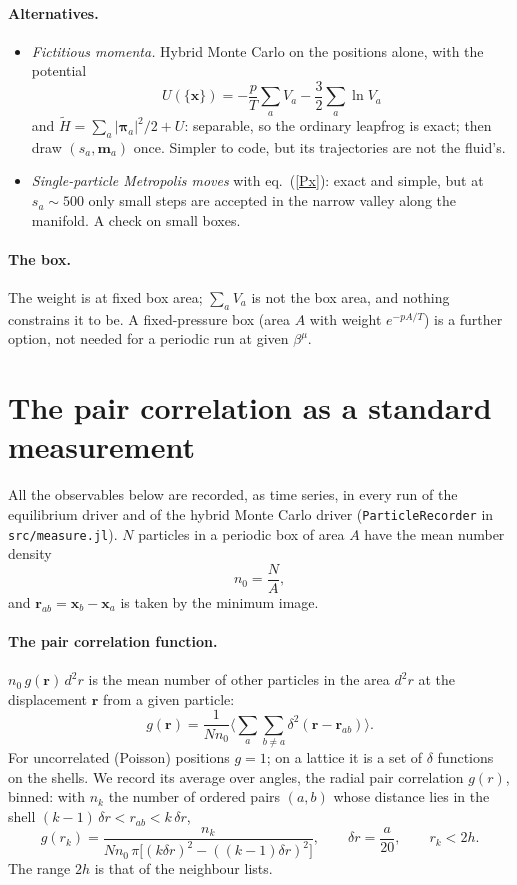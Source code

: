 \documentclass[11pt,aps,preprint,nofootinbib,superscriptaddress,tightenlines]{revtex4-2}
\def\st{\begin{equation}}
\def\stp{\end{equation}}
\def\Eq#1{eq.~(\ref{#1})}
\let\oldparagraph\paragraph
\renewcommand{\paragraph}{\par\bigskip\oldparagraph}
\begin{document}
\paragraph{Alternatives.}
\begin{itemize}
\item \emph{Fictitious momenta.}  Hybrid Monte Carlo on the positions alone, with the potential
  \st
  U(\{\bm x\})=-\frac pT\sum_aV_a-\frac32\sum_a\ln V_a
  \stp
  and $\tilde H=\sum_a|\bm\pi_a|^2/2+U$: separable, so the ordinary leapfrog is exact; then draw $(s_a,\bm m_a)$ once.  Simpler to code,
  but its trajectories are not the fluid's.
\item \emph{Single-particle Metropolis moves} with \Eq{Px}: exact and simple, but at $s_a\sim500$ only small steps are accepted in the
  narrow valley along the manifold.  A check on small boxes.
\end{itemize}

\paragraph{The box.}  The weight is at fixed box area; $\sum_aV_a$ is not the box area, and nothing constrains it to be.
A fixed-pressure box (area $A$ with weight $e^{-pA/T}$) is a further option, not needed for a periodic run at given
$\beta^\mu$.

\section{The pair correlation as a standard measurement}
\label{sec:measurements}

All the observables below are recorded, as time series, in every run of the equilibrium driver and of the hybrid Monte
Carlo driver (\texttt{ParticleRecorder} in \texttt{src/measure.jl}).  $N$ particles in a periodic box of area $A$ have the mean
number density
\st
n_0=\frac NA ,
\stp
and $\bm r_{ab}=\bm x_b-\bm x_a$ is taken by the minimum image.

\paragraph{The pair correlation function.}  $n_0\,g(\bm r)\,d^2r$ is the mean number of other particles in the area $d^2r$ at the
displacement $\bm r$ from a given particle:
\st
g(\bm r)=\frac1{Nn_0}\Big\langle\sum_a\sum_{b\neq a}\delta^2(\bm r-\bm r_{ab})\Big\rangle .
\stp
For uncorrelated (Poisson) positions $g=1$; on a lattice it is a set of $\delta$ functions on the shells.  We record its
average over angles, the radial pair correlation $g(r)$, binned: with $n_k$ the number of ordered pairs $(a,b)$ whose distance
lies in the shell $(k-1)\,\delta r<r_{ab}<k\,\delta r$,
\st
g(r_k)=\frac{n_k}{Nn_0\,\pi\big[(k\delta r)^2-((k-1)\delta r)^2\big]},\qquad \delta r=\frac a{20},\qquad r_k<2h .
\stp
The range $2h$ is that of the neighbour lists.
\end{document}
